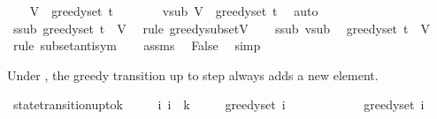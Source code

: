 \begin{isabellebody}
%
\isadelimproof
%
\endisadelimproof
%
\isatagproof
{}\isamarkupfalse%
\isanewline
\ \ \isamarkupfalse%
\ {\isachardoublequoteopen}V\ {\isacharminus}{\kern0pt}\ greedy{\isacharunderscore}{\kern0pt}set\ t\ {\isacharequal}{\kern0pt}\ {\isacharbraceleft}{\kern0pt}{\isacharbraceright}{\kern0pt}{\isachardoublequoteclose}\isanewline
\ \ \isamarkupfalse%
\ \isamarkupfalse%
\ vsub{\isacharcolon}{\kern0pt}\ {\isachardoublequoteopen}V\ {\isasymsubseteq}\ greedy{\isacharunderscore}{\kern0pt}set\ t{\isachardoublequoteclose}\ \isamarkupfalse%
\ auto\isanewline
\ \ \isamarkupfalse%
\ ssub{\isacharcolon}{\kern0pt}\ {\isachardoublequoteopen}greedy{\isacharunderscore}{\kern0pt}set\ t\ {\isasymsubseteq}\ V{\isachardoublequoteclose}\ \isamarkupfalse%
\ {\isacharparenleft}{\kern0pt}rule\ greedy{\isacharunderscore}{\kern0pt}subset{\isacharunderscore}{\kern0pt}V{\isacharparenright}{\kern0pt}\isanewline
\ \ \isamarkupfalse%
\ ssub\ vsub\ \isamarkupfalse%
\ {\isachardoublequoteopen}greedy{\isacharunderscore}{\kern0pt}set\ t\ {\isacharequal}{\kern0pt}\ V{\isachardoublequoteclose}\ \isamarkupfalse%
\ {\isacharparenleft}{\kern0pt}rule\ subset{\isacharunderscore}{\kern0pt}antisym{\isacharparenright}{\kern0pt}\isanewline
\ \ \isamarkupfalse%
\ assms\ \isamarkupfalse%
\ False\ \isamarkupfalse%
\ simp\isanewline
{}\isamarkupfalse%
%
\endisatagproof
{\isafoldproof}%
%
\isadelimproof
%
\endisadelimproof
%
\begin{isamarkuptext}%
Under , the greedy transition up to step  always adds a new
  element.%
\end{isamarkuptext}\isamarkuptrue%
\isamarkupfalse%
\ state{\isacharunderscore}{\kern0pt}transition{\isacharunderscore}{\kern0pt}upto{\isacharunderscore}{\kern0pt}k{\isacharcolon}{\kern0pt}\isanewline
\ \ \ {\isachardoublequoteopen}{}\ {\isacharless}{\kern0pt}\ i{\isachardoublequoteclose}\ {\isachardoublequoteopen}i\ {\isasymle}\ k{\isachardoublequoteclose}\isanewline
\ \ \ \ \ {\isachardoublequoteopen}greedy{\isacharunderscore}{\kern0pt}set\ i\ {\isacharequal}{\kern0pt}\isanewline
\ \ \ \ \ \ \ \ \ \ \ greedy{\isacharunderscore}{\kern0pt}set\ {\isacharparenleft}{\kern0pt}i\ {\isacharminus}{\kern0pt}\ {}{\isacharparenright}{\kern0pt}\isanewline

\end{isabellebody}
